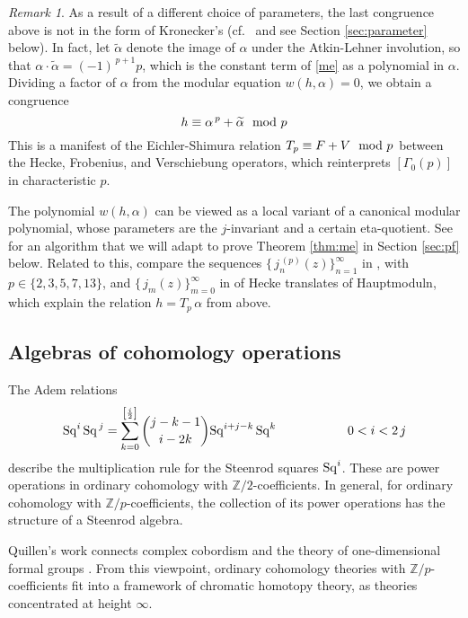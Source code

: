 \documentclass{gtpart}
\theoremstyle{definition}
\theoremstyle{remark}
\newtheorem{rmk}[equation]{Remark}
\newcommand{\mb}[1]{\mathbb{#1}}
\newcommand{\Sq}{{\rm Sq}}
\newcommand{\BZ}{{\mb Z}}
\newcommand{\tA}{\widetilde{\A}}
\newcommand{\md}{~~{\rm mod}~}
\newcommand{\A}{\alpha}
\newcommand{\G}{\Gamma}
\renewcommand{\=}{\approx}
\renewcommand{\-}{\sim}
\newcommand{\ch}[2]{{#1 \choose #2}}
\numberwithin{equation}{section}
\begin{document}
\begin{rmk}
 As a result of a different choice of parameters, the last congruence above is 
 not in the form of Kronecker's (cf.~\cite[Remark 7.7.1]{KM} and see Section 
 \ref{sec:parameter} below).  In fact, let $\tA$ denote the image of $\A$ under 
 the Atkin-Lehner involution, so that $\A \cdot \tA = (-1)^{\,p + 1} p$, which 
 is the constant term of \eqref{me} as a polynomial in $\A$.  Dividing a factor 
 of $\A$ from the modular equation $w(h,\A) = 0$, we obtain a congruence 
 \[
  h \equiv \A^{\,p} + \tA \md p 
 \]
 This is a manifest of the Eichler-Shimura relation $T_p \equiv F + V \md p$ 
 between the Hecke, Frobenius, and Verschiebung operators, which reinterprets 
 $[\G_0(p)]$ in characteristic $p$.  

 The polynomial $w(h,\A)$ can be viewed as a local variant of a canonical 
 modular polynomial, whose parameters are the $j$-invariant and a certain 
 eta-quotient.  See \cite[Example 2.4, esp.~(2.4)]{Choi} for an algorithm that 
 we will adapt to prove Theorem \ref{thm:me} in Section \ref{sec:pf} below.  
 Related to this, compare the sequences $\{\,j_n^{\,(p)}(z)\}_{n = 1}^\infty$ in 
 \cite{Ahlgren}, with $p \in \{2,3,5,7,13\}$, and $\{\,j_m(z)\}_{m = 0}^\infty$ 
 in \cite{BKO} of Hecke translates of Hauptmoduln, which explain the relation 
 $h = T_p \, \A$ from above.  
\end{rmk}



\subsection{Algebras of cohomology operations}

The Adem relations 
\begin{equation}
 \label{Adem}
 \Sq^i\,\Sq^{\,j} = \sum_{k = 0}^{\left[\frac{i}{2}\right]} 
                    \ch{j - k - 1}{i - 2 k} \Sq^{i + j - k}\,\Sq^k 
 \hskip 2cm 0 < i < 2\,j 
\end{equation}
describe the multiplication rule for the Steenrod squares $\Sq^i$.  These are 
power operations in ordinary cohomology with $\BZ/2$-coefficients.  In general, 
for ordinary cohomology with $\BZ/p$-coefficients, the collection of its power 
operations has the structure of a Steenrod algebra.  

Quillen's work connects complex cobordism and the theory of one-dimensional 
formal groups \cite{Quillen}.  From this viewpoint, ordinary cohomology theories 
with $\BZ/p$-coefficients fit into a framework of chromatic homotopy theory, as 
theories concentrated at height $\infty$.  
\end{document}
